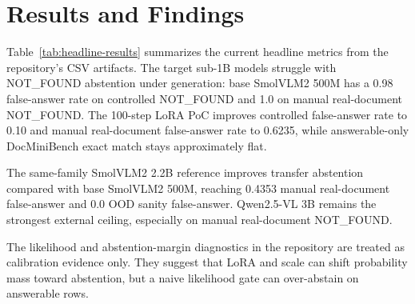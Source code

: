 \section{Results and Findings}

Table~\ref{tab:headline-results} summarizes the current headline metrics from
the repository's CSV artifacts. The target sub-1B models struggle with
NOT\_FOUND abstention under generation: base SmolVLM2 500M has a 0.98
false-answer rate on controlled NOT\_FOUND and 1.0 on manual real-document
NOT\_FOUND. The 100-step LoRA PoC improves controlled false-answer rate to
0.10 and manual real-document false-answer rate to 0.6235, while answerable-only
DocMiniBench exact match stays approximately flat.

The same-family SmolVLM2 2.2B reference improves transfer abstention compared
with base SmolVLM2 500M, reaching 0.4353 manual real-document false-answer and
0.0 OOD sanity false-answer. Qwen2.5-VL 3B remains the strongest external
ceiling, especially on manual real-document NOT\_FOUND.



The likelihood and abstention-margin diagnostics in the repository are treated
as calibration evidence only. They suggest that LoRA and scale can shift
probability mass toward abstention, but a naive likelihood gate can over-abstain
on answerable rows.
